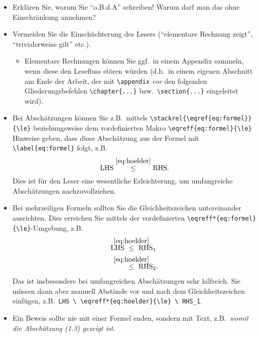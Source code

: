 \documentclass[../template_diplom.tex]{subfiles}
\begin{document}
\begin{itemize}
  \item Erklären Sie, warum Sie "`o.B.d.A"' schreiben! Warum darf man das ohne Einschrän\-kung annehmen?

  \item Vermeiden Sie die Einschüchterung des Lesers ("`elementare Rechnung zeigt"', "`trivialerweise gilt"' etc.).
        \begin{itemize}
          \item Elementare Rechnungen können Sie ggf.\ in einem Appendix sammeln, wenn diese den Lesefluss stören würden (d.h.\ in einem eigenen Abschnitt am Ende der Arbeit, der mit \verb$\appendix$ \emph{vor} den folgenden Gliederungsbefehlen \verb$\chapter{...}$ bzw.\ \verb$\section{...}$ eingeleitet wird).
        \end{itemize}

  \item Bei Abschätzungen können Sie z.B.\ mittels \verb$\stackrel{\eqref{eq:formel}}{\le}$ beziehungsweise dem vordefinierten Makro \verb$\eqreff{eq:formel}{\le}$ Hinweise geben, dass diese Abschätzung aus der Formel mit \verb$\label{eq:formel}$ folgt, z.B.
        \begin{equation*}
          \textup{LHS} \eqreff{eq:hoelder}{\le} \textup{RHS}.
        \end{equation*}
        Dies ist für den Leser eine wesentliche Erleichterung, um umfangreiche Abschätzungen nachzuvollziehen.

  \item Bei mehrzeiligen Formeln sollten Sie die Gleichheitszeichen untereinander ausrichten. Dies erreichen Sie mittels der vordefinierten \verb$\eqreff*{eq:formel}{\le}$-Umgebung, z.B.
        \begin{align*}
          \textup{LHS} \  & \eqreff*{eq:hoelder}{\le} \ \textup{RHS}_1  \\
                          & \eqreff*{eq:hoelder}{\le} \ \textup{RHS}_2.
        \end{align*}
        Das ist insbesondere bei umfangreichen Abschätzungen sehr hilfreich. Sie müssen dann aber
        manuell Abstände vor und nach dem Gleichheitszeichen einfügen, z.B.\ \verb$LHS \ \eqreff*{eq:hoelder}{\le} \ RHS_1$.

  \item Ein Beweis sollte nie mit einer Formel enden, sondern mit Text, z.B.\ \emph{womit die Abschätzung {\normalfont(1.3)} gezeigt ist.}
\end{itemize}
\end{document}
